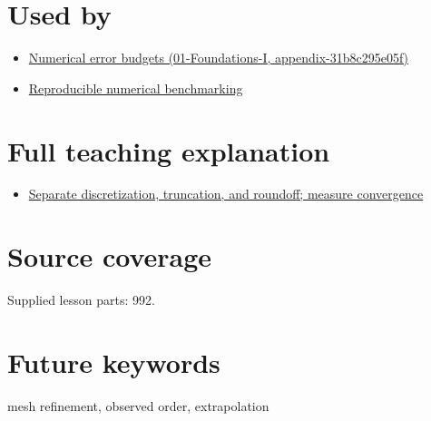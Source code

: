 \section{Used by}\label{appendix-aca80b6bf17a-used-by}

\begin{itemize}
\tightlist
\item
  \href{../01-Foundations-I/main.pdf\#nameddest=appendix-31b8c295e05f}{Numerical error budgets (01-Foundations-I, appendix-31b8c295e05f)}
\item
  \hyperref[appendix-b9db93e28371]{Reproducible numerical benchmarking}
\end{itemize}

\section{Full teaching explanation}\label{appendix-aca80b6bf17a-full-teaching-explanation}

\begin{itemize}
\tightlist
\item
  \href{Continuous\%20Notes/Computing\%20Foundations\%20-\%20From\%20Bits\%20to\%20C++\%20and\%20Systems\%20APIs\#Separate\%20discretization,\%20truncation,\%20and\%20roundoff;\%20measure\%20convergence}{Separate discretization, truncation, and roundoff; measure convergence}
\end{itemize}

\section{Source coverage}\label{appendix-aca80b6bf17a-source-coverage}

Supplied lesson parts: 992.

\section{Future keywords}\label{appendix-aca80b6bf17a-future-keywords}

mesh refinement, observed order, extrapolation

